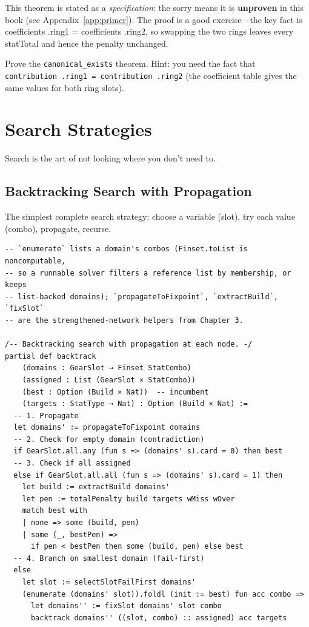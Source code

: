\documentclass[11pt, a4paper, oneside]{book}
\newcommand{\li}[1]{{\ttfamily\small\color{deepblue}#1}}
\begin{document}
This theorem is stated as a \emph{specification}: the \li{sorry} means it is
\textbf{unproven} in this book (see Appendix~\ref{app:primer}).  The proof is a
good exercise---the key fact is \li{coefficients .ring1 = coefficients .ring2},
so swapping the two rings leaves every \li{statTotal} and hence the penalty
unchanged.

\begin{exercisebox}
Prove the \texttt{canonical\_exists} theorem.  Hint: you need the fact that
\texttt{contribution .ring1 = contribution .ring2} (the coefficient table
gives the same values for both ring slots).
\end{exercisebox}

\chapter{Search Strategies}
\label{ch:search}

\epigraph{Search is the art of not looking where you don't need to.}{}

\section{Backtracking Search with Propagation}

The simplest complete search strategy: choose a variable (slot), try each
value (combo), propagate, recurse.

\begin{leanbox}[title={Lean 4 (Mathlib) --- Backtracking Search}]
\begin{verbatim}
-- `enumerate` lists a domain's combos (Finset.toList is noncomputable,
-- so a runnable solver filters a reference list by membership, or keeps
-- list-backed domains); `propagateToFixpoint`, `extractBuild`, `fixSlot`
-- are the strengthened-network helpers from Chapter 3.

/-- Backtracking search with propagation at each node. -/
partial def backtrack
    (domains : GearSlot → Finset StatCombo)
    (assigned : List (GearSlot × StatCombo))
    (best : Option (Build × Nat))  -- incumbent
    (targets : StatType → Nat) : Option (Build × Nat) :=
  -- 1. Propagate
  let domains' := propagateToFixpoint domains
  -- 2. Check for empty domain (contradiction)
  if GearSlot.all.any (fun s => (domains' s).card = 0) then best
  -- 3. Check if all assigned
  else if GearSlot.all.all (fun s => (domains' s).card = 1) then
    let build := extractBuild domains'
    let pen := totalPenalty build targets wMiss wOver
    match best with
    | none => some (build, pen)
    | some (_, bestPen) =>
      if pen < bestPen then some (build, pen) else best
  -- 4. Branch on smallest domain (fail-first)
  else
    let slot := selectSlotFailFirst domains'
    (enumerate (domains' slot)).foldl (init := best) fun acc combo =>
      let domains'' := fixSlot domains' slot combo
      backtrack domains'' ((slot, combo) :: assigned) acc targets
\end{verbatim}
\end{leanbox}
\end{document}

